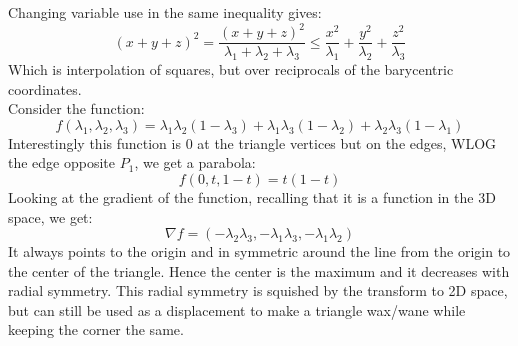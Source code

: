 Changing variable use in the same inequality gives:
\[(x+y+z)^2 = \frac{(x+y+z)^2}{\lambda_1+\lambda_2+\lambda_3} \leq \frac{x^2}{\lambda_1} +\frac{y^2}{\lambda_2} +\frac{z^2}{\lambda_3}\]
Which is interpolation of squares,
but over reciprocals of the barycentric coordinates.
\\
Consider the function:
\[f(\lambda_1,\lambda_2,\lambda_3) = \lambda_1\lambda_2(1-\lambda_3)+\lambda_1\lambda_3(1-\lambda_2)+\lambda_2\lambda_3(1-\lambda_1)\]
Interestingly this function is $0$ at the triangle vertices but on the edges, WLOG the edge opposite $P_1$, we get a parabola:
\[f(0,t,1-t) = t(1-t)\]
Looking at the gradient of the function,
recalling that it is a function in the 3D space,
we get:
\[\nabla f = (-\lambda_2\lambda_3,-\lambda_1\lambda_3,-\lambda_1\lambda_2)\]
It always points to the origin and in symmetric around the line from the origin to the center of the triangle.
Hence the center is the maximum and it decreases with radial symmetry.
This radial symmetry is squished by the transform to 2D space,
but can still be used as a displacement to make a triangle wax/wane while keeping the corner the same.

